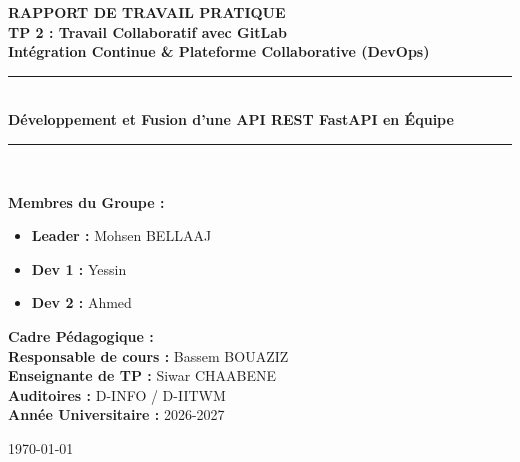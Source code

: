 \documentclass[a4paper,12pt]{article}
\begin{document}
\begin{titlepage}
    \centering
    \vspace*{1cm}
    
    {\Huge \textbf{RAPPORT DE TRAVAIL PRATIQUE}}\\[0.4cm]
    {\LARGE \textbf{TP 2 : Travail Collaboratif avec GitLab}}\\[0.2cm]
    {\large \textbf{Intégration Continue \& Plateforme Collaborative (DevOps)}}\\[1.5cm]
    
    \rule{\linewidth}{0.5mm}\\[0.4cm]
    {\LARGE \textbf{Développement et Fusion d'une API REST FastAPI en Équipe}}\\[0.2cm]
    \rule{\linewidth}{0.5mm}\\[2cm]

    \begin{minipage}{0.48\textwidth}
        \textbf{\large Membres du Groupe :}\\[0.3cm]
        \begin{itemize}
            \item \textbf{Leader :} Mohsen BELLAAJ
            \item \textbf{Dev 1 :} Yessin
            \item \textbf{Dev 2 :} Ahmed
        \end{itemize}
    \end{minipage}
    \hfill
    \begin{minipage}{0.48\textwidth}
        \textbf{\large Cadre Pédagogique :}\\[0.3cm]
        \textbf{Responsable de cours :} Bassem BOUAZIZ\\
        \textbf{Enseignante de TP :} Siwar CHAABENE\\
        \textbf{Auditoires :} D-INFO / D-IITWM\\
        \textbf{Année Universitaire :} 2026-2027
    \end{minipage}

    \vfill
    {\large \today}
\end{titlepage}

\tableofcontents
\newpage

\end{document}
